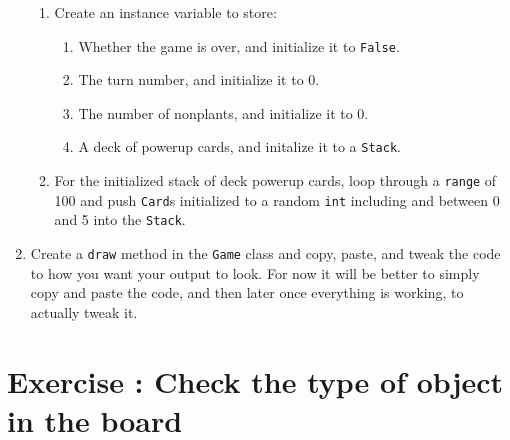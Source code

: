 \documentclass{42-en}
\begin{document}
\begin{enumerate}
\begin{enumerate}
    \item Create an instance variable to store:
   \begin{enumerate}\itemsep7pt
        \item Whether the game is over, and initialize it to \texttt{False}.
        \item The turn number, and initialize it to 0.
        \item The number of nonplants, and initialize it to 0.
        \item A deck of powerup cards, and initalize it to a \texttt{Stack}.
    \end{enumerate}
        \item For the initialized stack of deck powerup cards, loop through a \texttt{range} of 100 and push \texttt{Card}s initialized to a random \texttt{int} including and between 0 and 5 into the \texttt{Stack}.
    \end{enumerate}
 \item Create a \texttt{draw} method in the \texttt{Game} class and copy, paste, and tweak the code to how you want your output to look. For now it will be better to simply copy and paste the code, and then later once everything is working, to actually tweak it. 
    \end{enumerate}
\nextexercice
 
 \chapter{Exercise \exercicenumber: Check the type of object in the board}
\end{document}
